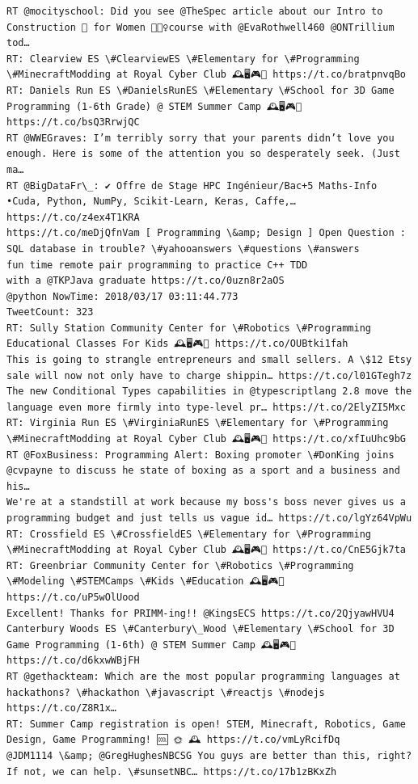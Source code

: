 \documentclass[11pt]{article}
\begin{document}
\begin{Verbatim}[commandchars=\\\{\}]
RT @mocityschool: Did you see @TheSpec article about our Intro to Construction 🚧 for Women 👷🏽‍♀️course with @EvaRothwell460 @ONTrillium tod…
RT: Clearview ES \#ClearviewES \#Elementary for \#Programming \#MinecraftModding at Royal Cyber Club 🕰️🖥️🎮💎 https://t.co/bratpnvqBo
RT: Daniels Run ES \#DanielsRunES \#Elementary \#School for 3D Game Programming (1-6th Grade) @ STEM Summer Camp 🕰️🖥️🎮💎 https://t.co/bsQ3RrwjQC
RT @WWEGraves: I’m terribly sorry that your parents didn’t love you enough. Here is some of the attention you so desperately seek. (Just ma…
RT @BigDataFr\_: ✔️ Offre de Stage HPC Ingénieur/Bac+5 Maths-Info
•Cuda, Python, NumPy, Scikit-Learn, Keras, Caffe,… https://t.co/z4ex4T1KRA
https://t.co/meDjQfnVam [ Programming \&amp; Design ] Open Question : SQL database in trouble? \#yahooanswers \#questions \#answers
fun time remote pair programming to practice C++ TDD 
with a @TKPJava graduate https://t.co/0uzn8r2aOS
@python NowTime: 2018/03/17 03:11:44.773
TweetCount: 323
RT: Sully Station Community Center for \#Robotics \#Programming Educational Classes For Kids 🕰️🖥️🎮💎 https://t.co/OUBtki1fah
This is going to strangle entrepreneurs and small sellers. A \$12 Etsy sale will now not only have to charge shippin… https://t.co/l01GTegh7z
The new Conditional Types capabilities in @typescriptlang 2.8 move the language even more firmly into type-level pr… https://t.co/2ElyZI5Mxc
RT: Virginia Run ES \#VirginiaRunES \#Elementary for \#Programming \#MinecraftModding at Royal Cyber Club 🕰️🖥️🎮💎 https://t.co/xfIuUhc9bG
RT @FoxBusiness: Programming Alert: Boxing promoter \#DonKing joins @cvpayne to discuss he state of boxing as a sport and a business and his…
We're at a standstill at work because my boss's boss never gives us a programming budget and just tells us vague id… https://t.co/lgYz64VpWu
RT: Crossfield ES \#CrossfieldES \#Elementary for \#Programming \#MinecraftModding at Royal Cyber Club 🕰️🖥️🎮💎 https://t.co/CnE5Gjk7ta
RT: Greenbriar Community Center for \#Robotics \#Programming \#Modeling \#STEMCamps \#Kids \#Education 🕰️🖥️🎮💎 https://t.co/uP5wOlUood
Excellent! Thanks for PRIMM-ing!! @KingsECS https://t.co/2QjyawHVU4
Canterbury Woods ES \#Canterbury\_Wood \#Elementary \#School for 3D Game Programming (1-6th) @ STEM Summer Camp 🕰️🖥️🎮💎 https://t.co/d6kxwWBjFH
RT @gethackteam: Which are the most popular programming languages at hackathons? \#hackathon \#javascript \#reactjs \#nodejs
https://t.co/Z8R1x…
RT: Summer Camp registration is open! STEM, Minecraft, Robotics, Game Design, Game Programming! 🆒 🌞 🕰️ https://t.co/vmLyRcifDq
@JDM1114 \&amp; @GregHughesNBCSG You guys are better than this, right? If not, we can help. \#sunsetNBC… https://t.co/17b1zBKxZh

\end{Verbatim}
\end{document}
